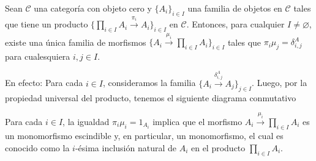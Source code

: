 \documentclass[tesis]{subfiles}
\begin{document}
\begin{Obs}\label{Obs: Producto en categorías con objeto cero}
    Sean $\mathscr{C}$ una categoría con objeto cero y $\{A_i\}_{i\in I}$ una familia de objetos en $\mathscr{C}$ tales que tiene un producto $\{\prod_{i\in I}A_i\xrightarrow[]{\pi_i} A_i\}_{i\in I}$ en $\mathscr{C}$. Entonces, para cualquier $I\neq\varnothing$, existe una única familia de morfismos $\{A_i\xrightarrow[]{\mu_i} \prod_{i\in I}A_i\}_{i\in I}$ tales que $\pi_i\mu_j = \delta^A_{i,j}$ para cualesquiera $i,j\in I$. 

    \vspace{1mm}
    En efecto: Para cada $i\in I$, consideramos la familia $\big\{A_i\xrightarrow[]{\delta_{i,j}^A} A_j\big\}_{j\in I}$. Luego, por la propiedad universal del producto, tenemos el siguiente diagrama conmutativo
        \begin{center}
        \end{center}
    Para cada $i\in I$, la igualdad $\pi_i\mu_i=1_{A_i}$ implica que el morfismo $A_i\xrightarrow[]{\mu_i} \prod_{i\in I}A_i$ es un monomorfismo escindible y, en particular, un monomorfismo, el cual es conocido como la $i$-ésima inclusión natural de $A_i$ en el producto $\prod_{i\in I}A_i$. 
\end{Obs}
\end{document}
